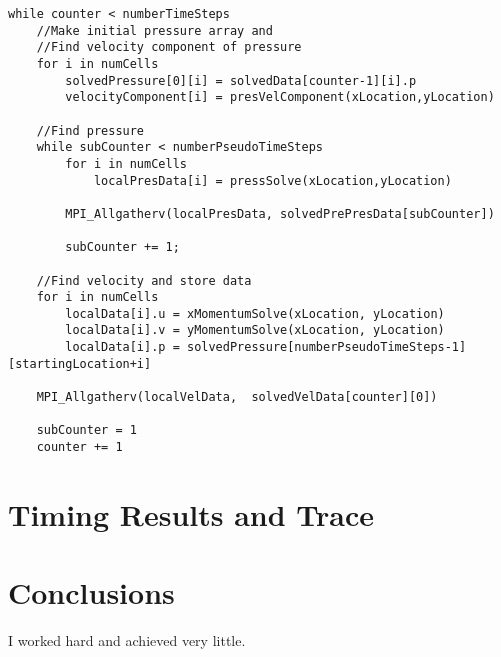 \documentclass[12pt]{article}
\begin{document}
\begin{lstlisting}
while counter < numberTimeSteps
	//Make initial pressure array and 
	//Find velocity component of pressure
	for i in numCells
		solvedPressure[0][i] = solvedData[counter-1][i].p
		velocityComponent[i] = presVelComponent(xLocation,yLocation)
	
	//Find pressure
	while subCounter < numberPseudoTimeSteps
		for i in numCells
			localPresData[i] = pressSolve(xLocation,yLocation)

		MPI_Allgatherv(localPresData, solvedPrePresData[subCounter])

		subCounter += 1;

	//Find velocity and store data
	for i in numCells
		localData[i].u = xMomentumSolve(xLocation, yLocation)
		localData[i].v = yMomentumSolve(xLocation, yLocation)
		localData[i].p = solvedPressure[numberPseudoTimeSteps-1][startingLocation+i]

	MPI_Allgatherv(localVelData,  solvedVelData[counter][0])

	subCounter = 1
	counter += 1
\end{lstlisting}

\section{Timing Results and Trace}

\section{Conclusions}
I worked hard and achieved very little.
\end{document}
